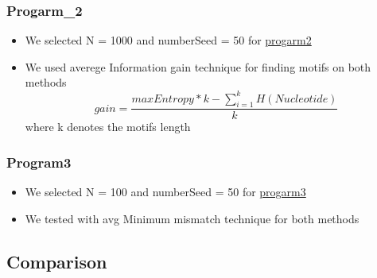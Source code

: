\documentclass[11pt]{article}
\begin{document}
              \subsubsection{Progarm_2}
              \begin{itemize}
                  \item We selected N = 1000 and numberSeed = 50 for \href{https://github.com/Superb-Man/Bio-Info/blob/master/main_2.ipynb}{progarm2}
                  \item We used averege Information gain technique for finding motifs on both methods
                    \[
                    gain = \frac{maxEntropy*k - \sum_{i=1}^{k} H(Nucleotide)}{k}
                    \]
                where k denotes the motifs length
              \end{itemize}
            \subsubsection{Program3}
                \begin{itemize}
                    \item We selected N = 100 and numberSeed = 50 for \href{https://github.com/Superb-Man/Bio-Info/blob/master/main_3.ipynb}{progarm3} 
                    \item We tested with avg Minimum mismatch technique for both methods
                \end{itemize}
            \newpage
          \subsection{Comparison}
\end{document}
